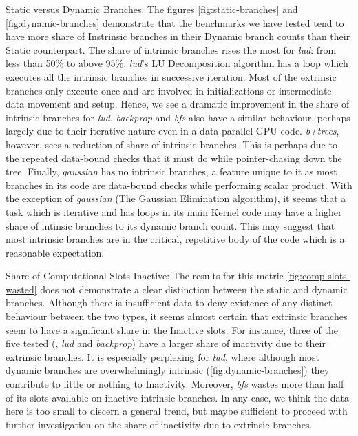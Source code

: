 

\label{sec:discussion}
\par{Static versus Dynamic Branches: The figures \ref{fig:static-branches} and \ref{fig:dynamic-branches} demonstrate that the benchmarks we have
tested tend to have more share of Instrinsic branches in their Dynamic branch counts than their Static counterpart. The share of intrinsic branches rises the most for \textsl{lud}: from less than 50\% to above 95\%. \textsl{lud}'s LU Decomposition algorithm has a loop which executes all the intrinsic branches in successive iteration. Most of the extrinsic branches only execute once and are involved in initializations or intermediate data movement and setup. Hence, we see a dramatic improvement in the share of intrinsic branches for \textsl{lud}. \textsl{backprop} and \textsl{bfs} also have a similar behaviour, perhaps largely due to their iterative nature even in a data-parallel GPU code. \textsl{b+trees}, however, sees a reduction of share of intrinsic branches. This is perhaps due to the repeated data-bound checks that it must do while pointer-chasing down the tree. Finally, \textsl{gaussian} has no intrinsic branches, a feature unique to it as most branches in its code are data-bound checks while performing scalar product. With the exception of \textsl{gaussian} (The Gaussian Elimination algorithm), it seems that a task which is iterative and has loops in its main Kernel code may have a higher share of intinsic branches to its dynamic branch count. This may suggest that most intrinsic branches are in the critical, repetitive body of the code which is a reasonable expectation.}

\par{Share of Computational Slots Inactive: The results for this metric \ref{fig:comp-slots-wasted} does not demonstrate a clear distinction between the static and dynamic branches. Although there is insufficient data to deny existence of any distinct behaviour between the two types, it seems almost certain that extrinsic branches seem to have a significant share in the Inactive slots. For instance, three of the five tested (, \textsl{lud} and \textsl{backprop}) have a larger share of inactivity due to their extrinsic branches. It is especially perplexing for \textsl{lud}, where although most dynamic branches are overwhelmingly intrinsic (\ref{fig:dynamic-branches}) they contribute to little or nothing to Inactivity. Moreover, \textsl{bfs} wastes more than half of its slots available on inactive intrinsic branches. In any case, we think the data here is too small to discern a general trend, but maybe sufficient to proceed with further investigation on the share of inactivity due to extrinsic branches.
}

